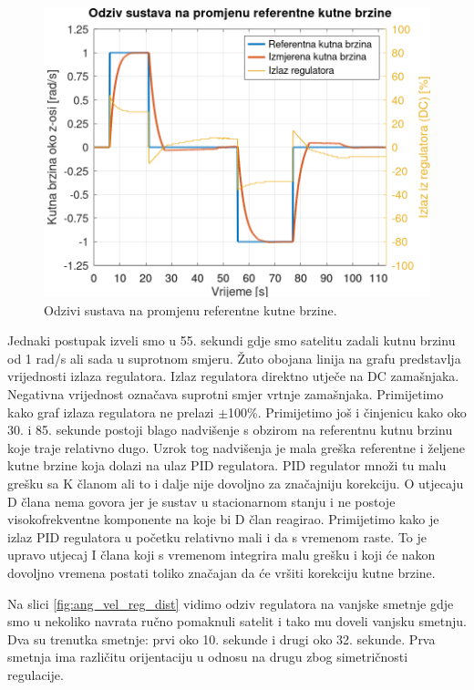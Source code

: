 \documentclass[times, utf8, diplomski, numeric]{templates/template}
\begin{document}
{{        \begin{figure}[h!]
        \centering
        \includegraphics[width=1.0\textwidth]{other/ang_vel_reg_user.png}
        \caption{Odzivi sustava na promjenu referentne kutne brzine.}
        \label{fig:ang_vel_reg_user}
        \end{figure}

        Jednaki postupak izveli smo u 55. sekundi gdje smo satelitu zadali kutnu brzinu od 1 rad/s ali sada u suprotnom smjeru. Žuto obojana linija na grafu predstavlja vrijednosti izlaza regulatora. Izlaz regulatora direktno utječe na DC zamašnjaka. Negativna vrijednost označava suprotni smjer vrtnje zamašnjaka. Primijetimo kako graf izlaza regulatora ne prelazi $\pm$100\%. Primijetimo još i činjenicu kako oko 30. i 85. sekunde postoji blago nadvišenje s obzirom na referentnu kutnu brzinu koje traje relativno dugo. Uzrok tog nadvišenja je mala greška referentne i željene kutne brzine koja dolazi na ulaz PID regulatora. PID regulator množi tu malu grešku sa K članom ali to i dalje nije dovoljno za značajniju korekciju. O utjecaju D člana nema govora jer je sustav u stacionarnom stanju i ne postoje visokofrekventne komponente na koje bi D član reagirao. Primijetimo kako je izlaz PID regulatora u početku relativno mali i da s vremenom raste. To je upravo utjecaj I člana koji s vremenom integrira malu grešku i koji će nakon dovoljno vremena postati toliko značajan da će vršiti korekciju kutne brzine. 

        Na slici \ref{fig:ang_vel_reg_dist} vidimo odziv regulatora na vanjske smetnje gdje smo u nekoliko navrata ručno pomaknuli satelit i tako mu doveli vanjsku smetnju. Dva su trenutka smetnje: prvi oko 10. sekunde i drugi oko 32. sekunde. Prva smetnja ima različitu orijentaciju u odnosu na drugu zbog simetričnosti regulacije. 

}}
\end{document}
